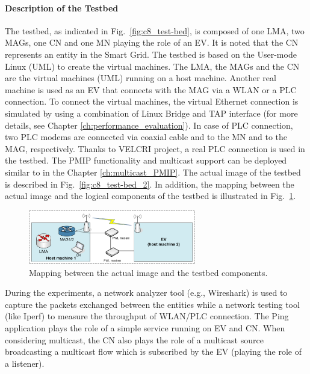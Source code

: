 \paragraph{Description of the Testbed}
The testbed, as indicated in Fig.~\ref{fig:c8_test-bed}, is composed of one LMA, two MAGs, one CN and one MN playing the role of an EV. It is noted that the CN represents an entity in the Smart Grid. The testbed is based on the User-mode Linux (UML) to create the virtual machines. The LMA, the MAGs and the CN are the virtual machines (UML) running on a host machine. Another real machine is used as an EV that connects with the MAG via a WLAN or a PLC connection. To connect the virtual machines, the virtual Ethernet connection is simulated by using a combination of Linux Bridge and TAP interface (for more details, see Chapter \ref{ch:performance_evaluation}). In case of PLC connection, two PLC modems are connected via coaxial cable and to the MN and to the MAG, respectively. Thanks to VELCRI project, a real PLC connection is used in the testbed. The PMIP functionality and multicast support can be deployed similar to in the Chapter \ref{ch:multicast_PMIP}. The actual image of the testbed is described in Fig.~\ref{fig:c8_test-bed_2}. In addition, the mapping between the actual image and the logical components of the testbed is illustrated in Fig.~\ref{fig:c8_mapping}.
\begin{figure}[h!] 
  \begin{center} 
    \includegraphics[width=0.65\textwidth]{./Part2/Chapter6/figures/c8_mapping.eps} 
    \caption[Mapping between the actual image and the testbed components.]{Mapping between the actual image and the testbed components.}
    \label{fig:c8_mapping}
  \end{center} 
\end{figure}

During the experiments, a network analyzer tool (e.g., Wireshark) is used to capture the packets exchanged between the entities while a network testing tool (like Iperf) to measure the throughput of WLAN/PLC connection. The Ping application plays the role of a simple service running on EV and CN. When considering multicast, the CN also plays the role of a multicast source broadcasting a multicast flow which is subscribed by the EV (playing the role of a listener).
